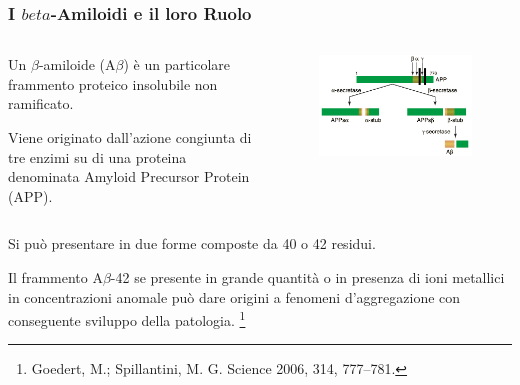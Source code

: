 \documentclass[9pt]{beamer}
\newcommand\blfootnote[1]{%
	\begingroup
	\renewcommand\thefootnote{}\footnote{#1}%
	\addtocounter{footnote}{-1}%
	\endgroup
}
\begin{document}
\begin{frame}
	\frametitle{I \(beta\)-Amiloidi e il loro Ruolo}
	\bigskip
	\begin{columns}
		\begin{column}{0.5\textwidth}
			Un $\beta$-amiloide (A$\beta$) è un particolare frammento proteico insolubile non ramificato.

			\smallskip
			Viene originato dall'azione congiunta di tre enzimi su di una proteina denominata Amyloid Precursor Protein (APP).
		\end{column}
		\begin{column}{0.5\textwidth}

			\begin{figure}
				\includegraphics[width=\textwidth]{immagini/APP.png}
			\end{figure}
		\end{column}
	\end{columns}

	\medskip
	Si può presentare in due forme composte da 40 o 42 residui.

	Il frammento A$\beta$-42 se presente in grande quantità o in presenza di ioni metallici in concentrazioni anomale può dare origini a fenomeni d'aggregazione con conseguente sviluppo della patologia. \blfootnote{Goedert, M.; Spillantini, M. G. Science 2006, 314, 777–781.}

\end{frame}
\end{document}
